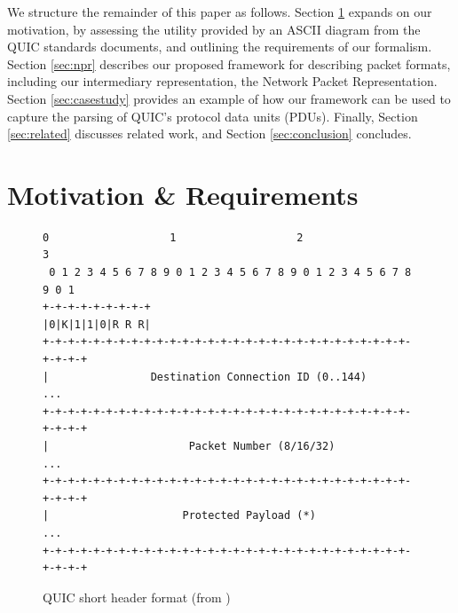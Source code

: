 \documentclass[10pt,sigconf]{acmart}
\begin{document}
We structure the remainder of this paper as follows. Section \ref{sec:motivation} expands
on our motivation, by assessing the utility provided by an ASCII diagram from the QUIC
standards documents, and outlining the requirements of our formalism. Section
\ref{sec:npr} describes our proposed framework for describing packet formats,
including our intermediary representation, the Network Packet Representation. Section
\ref{sec:casestudy} provides an example of how our framework can be used to capture
the parsing of QUIC's protocol data units (PDUs). Finally, Section \ref{sec:related} discusses
related work, and Section \ref{sec:conclusion} concludes.

%
%

\section{Motivation \& Requirements}
\label{sec:motivation}

\begin{figure}
	\centering
	\vspace{3mm}
    \begin{BVerbatim}[fontsize=\scriptsize]
 0                   1                   2                   3
 0 1 2 3 4 5 6 7 8 9 0 1 2 3 4 5 6 7 8 9 0 1 2 3 4 5 6 7 8 9 0 1
+-+-+-+-+-+-+-+-+
|0|K|1|1|0|R R R|
+-+-+-+-+-+-+-+-+-+-+-+-+-+-+-+-+-+-+-+-+-+-+-+-+-+-+-+-+-+-+-+-+
|                Destination Connection ID (0..144)           ...
+-+-+-+-+-+-+-+-+-+-+-+-+-+-+-+-+-+-+-+-+-+-+-+-+-+-+-+-+-+-+-+-+
|                      Packet Number (8/16/32)                ...
+-+-+-+-+-+-+-+-+-+-+-+-+-+-+-+-+-+-+-+-+-+-+-+-+-+-+-+-+-+-+-+-+
|                     Protected Payload (*)                   ...
+-+-+-+-+-+-+-+-+-+-+-+-+-+-+-+-+-+-+-+-+-+-+-+-+-+-+-+-+-+-+-+-+
    \end{BVerbatim}
    \caption{QUIC short header format (from \cite{draft-ietf-quic-transport-latest})}
    \label{fig:quic-short-hdr}
\end{figure}
\end{document}
